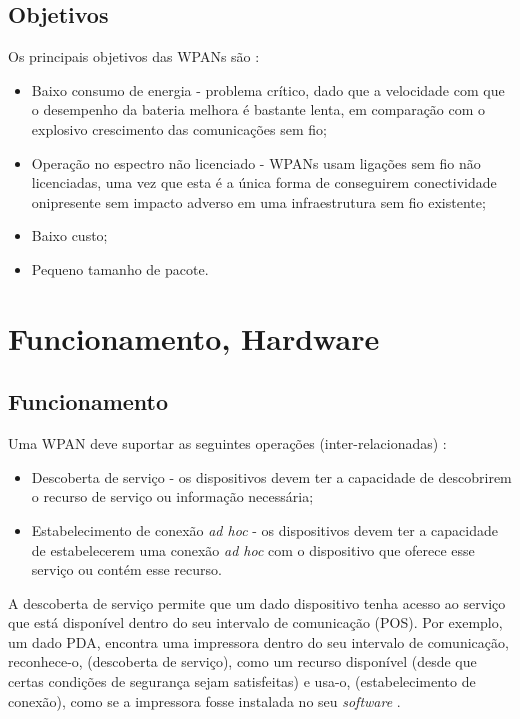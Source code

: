 \documentclass[conference]{IEEEtran}
\begin{document}
\subsection{Objetivos}

Os principais objetivos das WPANs são \cite{prasad2004ofdm}:

\begin{itemize}

 \item Baixo consumo de energia - problema crítico, dado que a velocidade com que o desempenho da bateria melhora é bastante lenta, em comparação com o explosivo crescimento das comunicações sem fio;
 \item Operação no espectro não licenciado - WPANs usam ligações sem fio não licenciadas, uma vez que esta é a única forma de conseguirem conectividade onipresente sem impacto adverso em uma infraestrutura sem fio existente;
 \item Baixo custo;
 \item Pequeno tamanho de pacote.
 
\end{itemize}


\section{Funcionamento, Hardware} \label{func_hard}

\subsection{Funcionamento}

Uma WPAN deve suportar as seguintes operações (inter-relacionadas) \cite{prasad2004ofdm}:

\begin{itemize}

 \item Descoberta de serviço - os dispositivos devem ter a capacidade de descobrirem o recurso de serviço ou informação necessária;
 \item Estabelecimento de conexão \textit{ad hoc} - os dispositivos devem ter a capacidade de estabelecerem uma conexão \textit{ad hoc} com o dispositivo que oferece esse serviço ou contém esse recurso.
 
\end{itemize}

A descoberta de serviço permite que um dado dispositivo tenha acesso ao serviço que está disponível dentro do seu intervalo de comunicação (POS).
Por exemplo, um dado PDA, encontra uma impressora dentro do seu intervalo de comunicação, reconhece-o, (descoberta de serviço), como um recurso disponível (desde que certas condições de segurança sejam satisfeitas) e usa-o, (estabelecimento de conexão), como se a impressora fosse instalada no seu \textit{software} \cite{prasad2004ofdm}.
\end{document}
